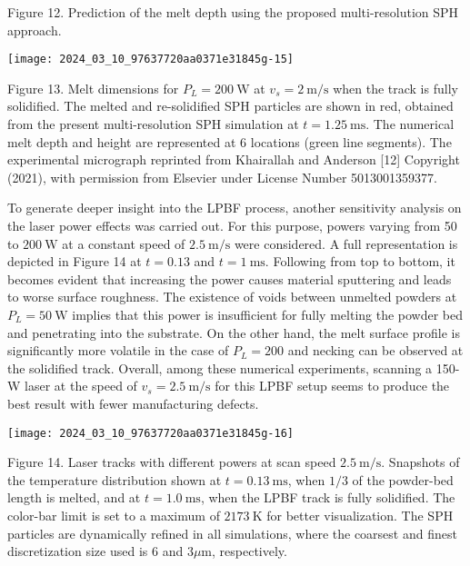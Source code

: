 \documentclass[10pt]{article}
\begin{document}
Figure 12. Prediction of the melt depth using the proposed multi-resolution SPH approach.

\begin{center}
\texttt{[image: 2024\_03\_10\_97637720aa0371e31845g-15]}
\end{center}

Figure 13. Melt dimensions for $P_{L}=200 \mathrm{~W}$ at $v_{s}=2 \mathrm{~m} / \mathrm{s}$ when the track is fully solidified. The melted and re-solidified SPH particles are shown in red, obtained from the present multi-resolution SPH simulation at $t=1.25 \mathrm{~ms}$. The numerical melt depth and height are represented at 6 locations (green line segments). The experimental micrograph reprinted from Khairallah and Anderson [12] Copyright (2021), with permission from Elsevier under License Number 5013001359377.

To generate deeper insight into the LPBF process, another sensitivity analysis on the laser power effects was carried out. For this purpose, powers varying from 50 to $200 \mathrm{~W}$ at a constant speed of $2.5 \mathrm{~m} / \mathrm{s}$ were considered. A full representation is depicted in Figure 14 at $t=0.13$ and $t=1 \mathrm{~ms}$. Following from top to bottom, it becomes evident that increasing the power causes material sputtering and leads to worse surface roughness. The existence of voids between unmelted powders at $P_{L}=50 \mathrm{~W}$ implies that this power is insufficient for fully melting the powder bed and penetrating into the substrate. On the other hand, the melt surface profile is significantly more volatile in the case of $P_{L}=200$ and necking can be observed at the solidified track. Overall, among these numerical experiments, scanning a 150-W laser at the speed of $v_{s}=2.5 \mathrm{~m} / \mathrm{s}$ for this LPBF setup seems to produce the best result with fewer manufacturing defects.

\begin{center}
\texttt{[image: 2024\_03\_10\_97637720aa0371e31845g-16]}
\end{center}

Figure 14. Laser tracks with different powers at scan speed $2.5 \mathrm{~m} / \mathrm{s}$. Snapshots of the temperature distribution shown at $t=0.13 \mathrm{~ms}$, when $1 / 3$ of the powder-bed length is melted, and at $t=1.0 \mathrm{~ms}$, when the LPBF track is fully solidified. The color-bar limit is set to a maximum of $2173 \mathrm{~K}$ for better visualization. The SPH particles are dynamically refined in all simulations, where the coarsest and finest discretization size used is 6 and $3 \mu \mathrm{m}$, respectively.
\end{document}
